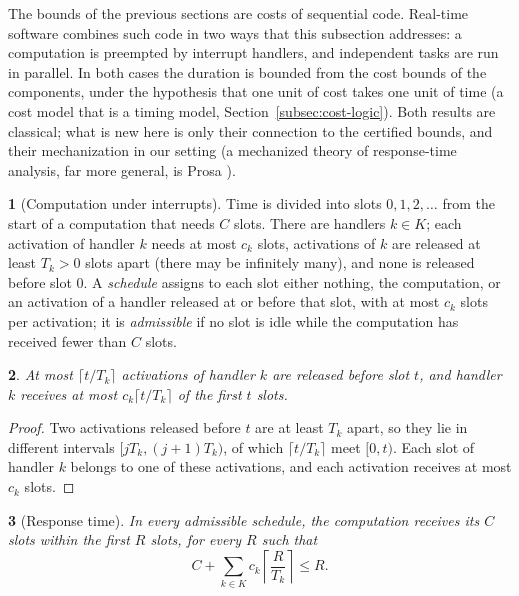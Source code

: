 \documentclass[oneside,english]{amsart}
\numberwithin{equation}{section}
\numberwithin{figure}{section}
\theoremstyle{plain}
\newtheorem{thm}{\protect\theoremname}
\theoremstyle{definition}
\newtheorem{defn}[thm]{\protect\definitionname}
\theoremstyle{plain}
\theoremstyle{remark}
\theoremstyle{plain}
\newtheorem{lem}[thm]{\protect\lemmaname}
\theoremstyle{definition}
\theoremstyle{plain}
\theoremstyle{remark}
\providecommand{\definitionname}{Definition}
\providecommand{\lemmaname}{Lemma}
\providecommand{\theoremname}{Theorem}
\begin{document}
The bounds of the previous sections are costs of sequential code. Real-time software combines such code in two ways that this subsection addresses: a computation is preempted by interrupt handlers, and independent tasks are run in parallel. In both cases the duration is bounded from the cost bounds of the components, under the hypothesis that one unit of cost takes one unit of time (a cost model that is a timing model, Section~\ref{subsec:cost-logic}). Both results are classical; what is new here is only their connection to the certified bounds, and their mechanization in our setting (a mechanized theory of response-time analysis, far more general, is Prosa \cite{cerqueira2016prosa}).

\begin{defn}[Computation under interrupts]
\label{def:interrupt-model}
Time is divided into slots $0, 1, 2, \dots$ from the start of a computation that needs $C$ slots. There are handlers $k \in K$; each activation of handler $k$ needs at most $c_k$ slots, activations of $k$ are released at least $T_k > 0$ slots apart (there may be infinitely many), and none is released before slot $0$. A \emph{schedule} assigns to each slot either nothing, the computation, or an activation of a handler released at or before that slot, with at most $c_k$ slots per activation; it is \emph{admissible} if no slot is idle while the computation has received fewer than $C$ slots.
\end{defn}

\begin{lem}
\label{lem:sporadic}
At most $\lceil t / T_k \rceil$ activations of handler $k$ are released before slot $t$, and handler $k$ receives at most $c_k \lceil t / T_k \rceil$ of the first $t$ slots.
\end{lem}

\begin{proof}
Two activations released before $t$ are at least $T_k$ apart, so they lie in different intervals $[jT_k, (j+1)T_k)$, of which $\lceil t/T_k \rceil$ meet $[0, t)$. Each slot of handler $k$ belongs to one of these activations, and each activation receives at most $c_k$ slots.
\end{proof}

\begin{thm}[Response time]
\label{thm:response-time}
In every admissible schedule, the computation receives its $C$ slots within the first $R$ slots, for every $R$ such that
\[ C + \sum_{k \in K} c_k \left\lceil \frac{R}{T_k} \right\rceil \le R. \]
\end{thm}
\end{document}
